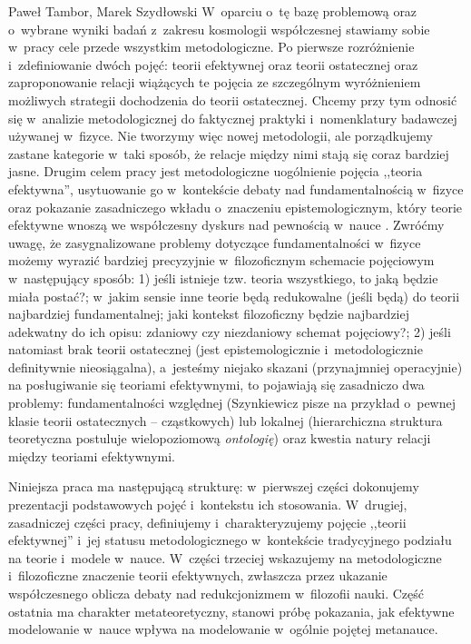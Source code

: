 \begin{artplenv2auth}{Paweł Tambor, Marek Szydłowski}
W~oparciu o~tę bazę problemową oraz o~wybrane wyniki badań z~zakresu kosmologii współczesnej stawiamy sobie w~pracy cele przede wszystkim metodologiczne. Po pierwsze rozróżnienie i~zdefiniowanie dwóch pojęć: teorii efektywnej oraz teorii ostatecznej oraz zaproponowanie relacji wiążących te pojęcia ze szczególnym wyróżnieniem możliwych strategii dochodzenia do teorii ostatecznej. Chcemy przy tym odnosić się w~analizie metodologicznej do faktycznej praktyki i~nomenklatury badawczej używanej w~fizyce. Nie tworzymy więc nowej metodologii, ale porządkujemy zastane kategorie w~taki sposób, że relacje między nimi stają się coraz bardziej jasne. Drugim celem pracy jest metodologiczne uogólnienie pojęcia ,,teoria efektywna'', usytuowanie go w~kontekście debaty nad fundamentalnością w~fizyce oraz pokazanie zasadniczego wkładu o~znaczeniu epistemologicznym, który teorie efektywne wnoszą we współczesny dyskurs nad pewnością w~nauce
\parencite[][]{szydlowski_model_2008}. %
 Zwróćmy uwagę, że zasygnalizowane problemy dotyczące fundamentalności w~fizyce możemy wyrazić bardziej precyzyjnie w~filozoficznym schemacie pojęciowym w~następujący sposób: 1) jeśli istnieje tzw. teoria wszystkiego, to jaką będzie miała postać?; w~jakim sensie inne teorie będą redukowalne (jeśli będą) do teorii najbardziej fundamentalnej; jaki kontekst filozoficzny będzie najbardziej adekwatny do ich opisu: zdaniowy czy niezdaniowy schemat pojęciowy?; 2) jeśli natomiast brak teorii ostatecznej (jest epistemologicznie i~metodologicznie definitywnie nieosiągalna), a~jesteśmy niejako skazani (przynajmniej operacyjnie) na posługiwanie się teoriami efektywnymi, to pojawiają się zasadniczo dwa problemy: fundamentalności względnej (Szynkiewicz pisze na przykład o~pewnej klasie teorii ostatecznych -- cząstkowych) lub lokalnej (hierarchiczna struktura teoretyczna postuluje wielopoziomową \textit{ontologię}) oraz kwestia natury relacji między teoriami efektywnymi.

Niniejsza praca ma następującą strukturę: w~pierwszej części dokonujemy prezentacji podstawowych pojęć i~kontekstu ich stosowania. W~drugiej, zasadniczej części pracy, definiujemy i~charakteryzujemy pojęcie ,,teorii efektywnej'' i~jej statusu metodologicznego w~kontekście tradycyjnego podziału na teorie i~modele w~nauce. W~części trzeciej wskazujemy na metodologiczne i~filozoficzne znaczenie teorii efektywnych, zwłaszcza przez ukazanie współczesnego oblicza debaty nad redukcjonizmem w~filozofii nauki. Część ostatnia ma charakter metateoretyczny, stanowi próbę pokazania, jak efektywne modelowanie w~nauce wpływa na modelowanie w~ogólnie pojętej metanauce.


\end{artplenv2auth}
